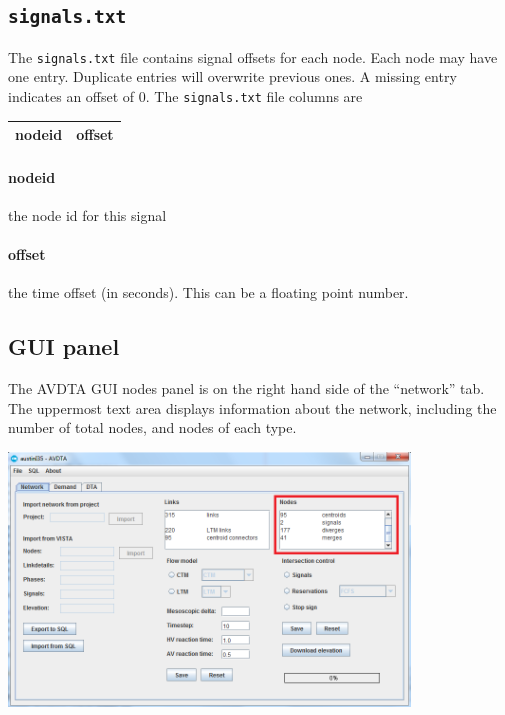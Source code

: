 \subsection{\texttt{signals.txt}}
The \texttt{signals.txt} file contains signal offsets for each node. Each node may have one entry. Duplicate entries will overwrite previous ones. A missing entry indicates an offset of $0$. The \texttt{signals.txt} file columns are
\begin{center}
\begin{tabular}{cc}
\hline
nodeid & offset\\\hline
\end{tabular}
\end{center}
\paragraph*{nodeid} the node id for this signal
\paragraph*{offset} the time offset (in seconds). This can be a floating point number.


\subsection{GUI panel}

The AVDTA GUI nodes panel is on the right hand side of the ``network'' tab. The uppermost text area displays information about the network, including the number of total nodes, and nodes of each type.
\begin{center}
\includegraphics[width=0.8\textwidth]{images/nodes1.png}
\end{center}

